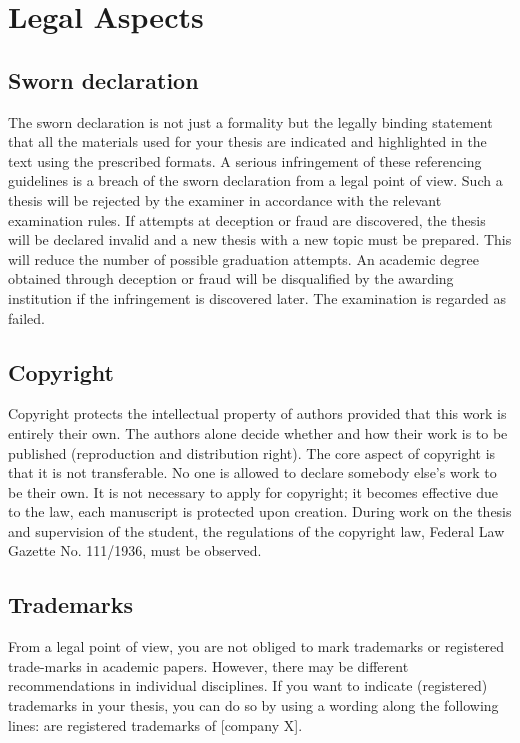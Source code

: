 \section{Legal Aspects}
\subsection{Sworn declaration}
The sworn declaration is not just a formality but the legally binding statement that all the materials used for your thesis are indicated and highlighted in the text using the prescribed formats. A serious infringement of these referencing guidelines is a breach of the sworn declaration from a legal point of view. Such a thesis will be rejected by the examiner in accordance with the relevant examination rules.
\vspace{3mm}\newline
If attempts at deception or fraud are discovered, the thesis will be declared invalid and a new thesis with a new topic must be prepared. This will reduce the number of possible graduation attempts.
\vspace{3mm}\newline
An academic degree obtained through deception or fraud will be disqualified by the awarding institution if the infringement is discovered later. The examination is regarded as failed.

\subsection{Copyright}
Copyright protects the intellectual property of authors provided that this work is entirely their own. The authors alone decide whether and how their work is to be published (reproduction and distribution right).
\vspace{3mm}\newline
The core aspect of copyright is that it is not transferable. No one is allowed to declare somebody else’s work to be their own. It is not necessary to apply for copyright; it becomes effective due to the law, \eg each manuscript is protected upon creation.
\vspace{3mm}\newline
During work on the thesis and supervision of the student, the regulations of the copyright law, Federal Law Gazette No. 111/1936, must be observed.

\subsection{Trademarks}
From a legal point of view, you are not obliged to mark trademarks or registered trade-marks in academic papers. However, there may be different recommendations in individual disciplines. If you want to indicate (registered) trademarks in your thesis, you can do so by using a wording along the following lines:
\vspace{3mm} are registered trademarks of [company X].